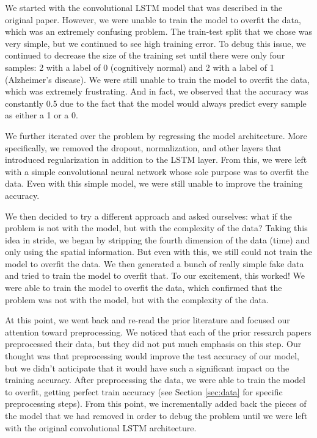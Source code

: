 \documentclass[11pt]{article}
\begin{document}
	We started with the convolutional LSTM model that was described in the original paper. However, we were unable to train the model to overfit the data, which was an extremely confusing problem. The train-test split that we chose was very simple, but we continued to see high training error. To debug this issue, we continued to decrease the size of the training set until there were only four samples: 2 with a label of 0 (cognitively normal) and 2 with a label of 1 (Alzheimer's disease). We were still unable to train the model to overfit the data, which was extremely frustrating. And in fact, we observed that the accuracy was constantly 0.5 due to the fact that the model would always predict every sample as either a 1 or a 0.

	We further iterated over the problem by regressing the model architecture. More specifically, we removed the dropout, normalization, and other layers that introduced regularization in addition to the LSTM layer. From this, we 
	were left with a simple convolutional neural network whose sole purpose was to overfit the data. Even with this simple model, we were still unable to improve the training accuracy. 

	We then decided to try a different approach and asked ourselves: what if the problem is not with the model, but with the complexity of the data? Taking this idea in stride, we began by stripping the fourth dimension of the data (time) and only using the spatial information. But even with this, we still could not train the model to overfit the data. We then generated a bunch of really simple fake data and tried to train the model to overfit that. To our excitement, this worked! We were able to train the model to overfit the data, which confirmed that the problem was not with the model, but with the complexity of the data.

	At this point, we went back and re-read the prior literature and focused our attention toward preprocessing. We noticed that each of the prior research papers preprocessed their data, but they did not put much emphasis on this step. Our thought was that preprocessing would improve the test accuracy of our model, but we didn't anticipate that it would have such a significant impact on the training accuracy. After preprocessing the data, we were able to train the model to overfit, getting perfect train accuracy (see Section \ref{sec:data} for specific preprocessing steps). From this point, we incrementally added back the pieces of the model that we had removed in order to debug the problem until we were left with the original convolutional LSTM architecture. 
	
\end{document}
